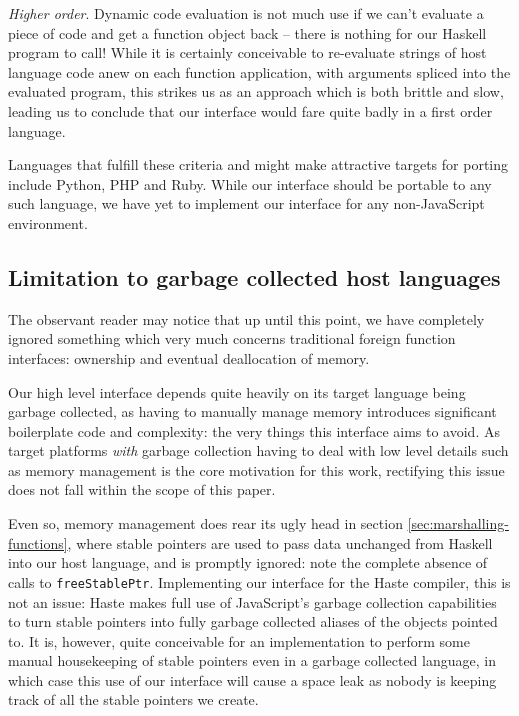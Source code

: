 \documentclass{sigplanconf}
\begin{document}
\emph{Higher order}. Dynamic code evaluation is not much use if we can't
evaluate a piece of code and get a function object back -- there is nothing
for our Haskell program to call! While it is certainly conceivable to
re-evaluate strings of host language code anew on each function application,
with arguments spliced into the evaluated program, this strikes us as an
approach which is both brittle and slow, leading us to conclude that our
interface would fare quite badly in a first order language.

Languages that fulfill these criteria and might make attractive targets
for porting include Python, PHP and Ruby. While our interface should be
portable to any such language, we have yet to implement our interface
for any non-JavaScript environment.


\subsection{Limitation to garbage collected host languages}
\label{sec:host-gc}
The observant reader may notice that up until this point, we have completely
ignored something which very much concerns traditional foreign function
interfaces: ownership and eventual deallocation of memory.

Our high level interface depends quite heavily on its target language being
garbage collected, as having to manually manage memory introduces significant
boilerplate code and complexity: the very things this interface aims to avoid.
As target platforms \emph{with} garbage collection having to deal with low
level details such as memory management is the core motivation for this work,
rectifying this issue does not fall within the scope of this paper.

Even so, memory management does rear its ugly head in section
\ref{sec:marshalling-functions}, where stable pointers are used to pass data
unchanged from Haskell into our host language, and is promptly ignored: note
the complete absence of calls to \lstinline!freeStablePtr!. Implementing our
interface for the Haste compiler, this is not an issue: Haste makes full use
of JavaScript's garbage collection capabilities to turn stable pointers into
fully garbage collected aliases of the objects pointed to.
It is, however, quite conceivable for an implementation to perform some manual
housekeeping of stable pointers even in a garbage collected language, in which
case this use of our interface will cause a space leak as nobody is keeping
track of all the stable pointers we create.
\end{document}
